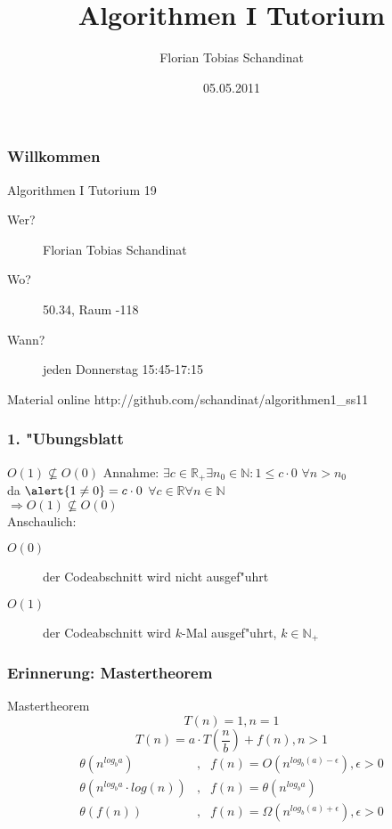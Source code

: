 \documentclass{beamer}
\title{Algorithmen I Tutorium}
\author{Florian Tobias Schandinat}
\date{05.05.2011}
\institute{FTS}
\begin{document}
\begin{frame}
\frametitle{Willkommen}
\begin{block}{Algorithmen I Tutorium 19}
\begin{description}
\item[Wer?] Florian Tobias Schandinat\\
\item[Wo?] 50.34, Raum -118\\
\item[Wann?] jeden Donnerstag 15:45-17:15
\end{description}
\end{block}

\begin{block}{Material online}
http://github.com/schandinat/algorithmen1\_ss11
\end{block}
\end{frame}


\begin{frame}
\frametitle{1. "Ubungsblatt}
\begin{block}{$O(1) \not\subseteq O(0)$}
\pause
Annahme: $\exists c \in \mathbb{R_+} \exists n_0 \in \mathbb{N}: 1 \leq c \cdot 0$ \hspace{0.5cm} $\forall n > n_0$\pause\\
da $\alert{1 \not= 0} = c \cdot 0$\hspace{0.5cm} $\forall c \in \mathbb{R} \forall n \in \mathbb{N}$\\
$\Longrightarrow O(1) \not\subseteq O(0)$\\[1cm]
\pause
Anschaulich:
\begin{description}
\item[$O(0)$] der Codeabschnitt wird \alert{nicht} ausgef"uhrt
\item[$O(1)$] der Codeabschnitt wird $k$-Mal ausgef"uhrt, $k \in \mathbb{N}_+$
\end{description}
\end{block}
\end{frame}


\begin{frame}
\frametitle{Erinnerung: Mastertheorem}
\begin{block}{Mastertheorem}
$$T(n) = 1, n = 1$$
$$T(n) = a \cdot T\left(\frac{n}{b}\right) + f(n), n > 1$$
\begin{eqnarray*}
\theta(n^{log_b a})&,& f(n) = O(n^{log_b(a)-\epsilon}), \epsilon > 0\\
\theta(n^{log_b a} \cdot log(n))&,& f(n) = \theta(n^{log_b a})\\
\theta(f(n))&,& f(n) = \Omega(n^{log_b (a)+\epsilon}), \epsilon > 0
\end{eqnarray*}
\end{block}
\end{frame}
\end{document}
